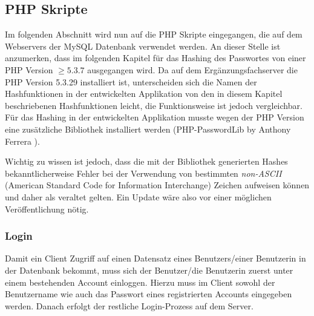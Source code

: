 \documentclass[../main.tex]{subfiles}
\begin{document}
	
	\subsection{PHP Skripte}
	Im folgenden Abschnitt wird nun auf die PHP Skripte eingegangen, die auf dem Webservers der MySQL Datenbank verwendet werden. An dieser Stelle ist anzumerken, dass im folgenden Kapitel für das Hashing des Passwortes von einer PHP Version $\ge 5.3.7$ ausgegangen wird. Da auf dem Ergänzungsfachserver die PHP Version 5.3.29 installiert ist, unterscheiden sich die Namen der Hashfunktionen in der entwickelten Applikation von den in diesem Kapitel beschriebenen Hashfunktionen leicht, die Funktionsweise ist jedoch vergleichbar. Für das Hashing in der entwickelten Applikation  musste wegen der PHP Version eine zusätzliche Bibliothek installiert werden (PHP-PasswordLib by Anthony Ferrera \cite{PWLib}).
	
	Wichtig zu wissen ist jedoch, dass die mit der Bibliothek generierten Hashes bekanntlicherweise Fehler bei der Verwendung von bestimmten \emph{non-ASCII} (American Standard Code for Information Interchange) Zeichen aufweisen können und daher als veraltet gelten. Ein Update wäre also vor einer möglichen Veröffentlichung nötig. \cite{bcryptBug}
	
	\subsubsection{Login}
	Damit ein Client Zugriff auf einen Datensatz eines Benutzers/einer Benutzerin in der Datenbank bekommt, muss sich der Benutzer/die Benutzerin zuerst unter einem bestehenden Account einloggen. Hierzu muss im Client sowohl der Benutzername wie auch das Passwort eines registrierten Accounts eingegeben werden. Danach erfolgt der restliche Login-Prozess auf dem Server.
	 
\end{document}
